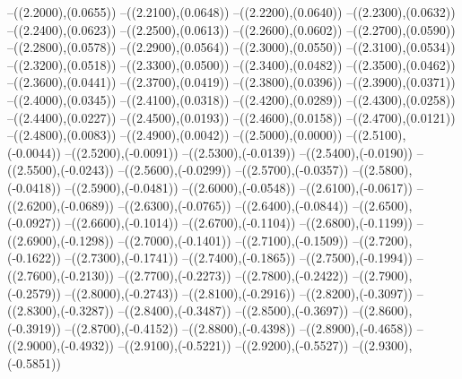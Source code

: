 {	--({\sx*(2.2000)},{\sy*(0.0655)})
	--({\sx*(2.2100)},{\sy*(0.0648)})
	--({\sx*(2.2200)},{\sy*(0.0640)})
	--({\sx*(2.2300)},{\sy*(0.0632)})
	--({\sx*(2.2400)},{\sy*(0.0623)})
	--({\sx*(2.2500)},{\sy*(0.0613)})
	--({\sx*(2.2600)},{\sy*(0.0602)})
	--({\sx*(2.2700)},{\sy*(0.0590)})
	--({\sx*(2.2800)},{\sy*(0.0578)})
	--({\sx*(2.2900)},{\sy*(0.0564)})
	--({\sx*(2.3000)},{\sy*(0.0550)})
	--({\sx*(2.3100)},{\sy*(0.0534)})
	--({\sx*(2.3200)},{\sy*(0.0518)})
	--({\sx*(2.3300)},{\sy*(0.0500)})
	--({\sx*(2.3400)},{\sy*(0.0482)})
	--({\sx*(2.3500)},{\sy*(0.0462)})
	--({\sx*(2.3600)},{\sy*(0.0441)})
	--({\sx*(2.3700)},{\sy*(0.0419)})
	--({\sx*(2.3800)},{\sy*(0.0396)})
	--({\sx*(2.3900)},{\sy*(0.0371)})
	--({\sx*(2.4000)},{\sy*(0.0345)})
	--({\sx*(2.4100)},{\sy*(0.0318)})
	--({\sx*(2.4200)},{\sy*(0.0289)})
	--({\sx*(2.4300)},{\sy*(0.0258)})
	--({\sx*(2.4400)},{\sy*(0.0227)})
	--({\sx*(2.4500)},{\sy*(0.0193)})
	--({\sx*(2.4600)},{\sy*(0.0158)})
	--({\sx*(2.4700)},{\sy*(0.0121)})
	--({\sx*(2.4800)},{\sy*(0.0083)})
	--({\sx*(2.4900)},{\sy*(0.0042)})
	--({\sx*(2.5000)},{\sy*(0.0000)})
	--({\sx*(2.5100)},{\sy*(-0.0044)})
	--({\sx*(2.5200)},{\sy*(-0.0091)})
	--({\sx*(2.5300)},{\sy*(-0.0139)})
	--({\sx*(2.5400)},{\sy*(-0.0190)})
	--({\sx*(2.5500)},{\sy*(-0.0243)})
	--({\sx*(2.5600)},{\sy*(-0.0299)})
	--({\sx*(2.5700)},{\sy*(-0.0357)})
	--({\sx*(2.5800)},{\sy*(-0.0418)})
	--({\sx*(2.5900)},{\sy*(-0.0481)})
	--({\sx*(2.6000)},{\sy*(-0.0548)})
	--({\sx*(2.6100)},{\sy*(-0.0617)})
	--({\sx*(2.6200)},{\sy*(-0.0689)})
	--({\sx*(2.6300)},{\sy*(-0.0765)})
	--({\sx*(2.6400)},{\sy*(-0.0844)})
	--({\sx*(2.6500)},{\sy*(-0.0927)})
	--({\sx*(2.6600)},{\sy*(-0.1014)})
	--({\sx*(2.6700)},{\sy*(-0.1104)})
	--({\sx*(2.6800)},{\sy*(-0.1199)})
	--({\sx*(2.6900)},{\sy*(-0.1298)})
	--({\sx*(2.7000)},{\sy*(-0.1401)})
	--({\sx*(2.7100)},{\sy*(-0.1509)})
	--({\sx*(2.7200)},{\sy*(-0.1622)})
	--({\sx*(2.7300)},{\sy*(-0.1741)})
	--({\sx*(2.7400)},{\sy*(-0.1865)})
	--({\sx*(2.7500)},{\sy*(-0.1994)})
	--({\sx*(2.7600)},{\sy*(-0.2130)})
	--({\sx*(2.7700)},{\sy*(-0.2273)})
	--({\sx*(2.7800)},{\sy*(-0.2422)})
	--({\sx*(2.7900)},{\sy*(-0.2579)})
	--({\sx*(2.8000)},{\sy*(-0.2743)})
	--({\sx*(2.8100)},{\sy*(-0.2916)})
	--({\sx*(2.8200)},{\sy*(-0.3097)})
	--({\sx*(2.8300)},{\sy*(-0.3287)})
	--({\sx*(2.8400)},{\sy*(-0.3487)})
	--({\sx*(2.8500)},{\sy*(-0.3697)})
	--({\sx*(2.8600)},{\sy*(-0.3919)})
	--({\sx*(2.8700)},{\sy*(-0.4152)})
	--({\sx*(2.8800)},{\sy*(-0.4398)})
	--({\sx*(2.8900)},{\sy*(-0.4658)})
	--({\sx*(2.9000)},{\sy*(-0.4932)})
	--({\sx*(2.9100)},{\sy*(-0.5221)})
	--({\sx*(2.9200)},{\sy*(-0.5527)})
	--({\sx*(2.9300)},{\sy*(-0.5851)})
}
